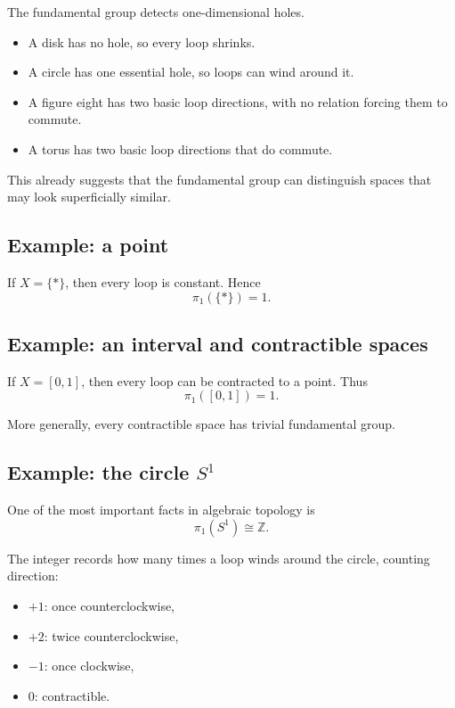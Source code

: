 \documentclass[12pt,a4paper]{article}
\theoremstyle{notespace}
\begin{document}
The fundamental group detects one-dimensional holes.

\begin{itemize}
	\item A disk has no hole, so every loop shrinks.
	\item A circle has one essential hole, so loops can wind around it.
	\item A figure eight has two basic loop directions, with no relation forcing them to commute.
	\item A torus has two basic loop directions that do commute.
\end{itemize}

This already suggests that the fundamental group can distinguish spaces that may look superficially similar.

\bigskip

\subsection{Example: a point}

If \(X=\{*\}\), then every loop is constant. Hence
\[
\pi_1(\{*\})=1.
\]

\bigskip

\subsection{Example: an interval and contractible spaces}

If \(X=[0,1]\), then every loop can be contracted to a point. Thus
\[
\pi_1([0,1])=1.
\]

More generally, every contractible space has trivial fundamental group.

\bigskip

\subsection{ Example: the circle \texorpdfstring{$S^1$}{S1}}

One of the most important facts in algebraic topology is
\[
\pi_1(S^1)\cong \mathbb Z.
\]

The integer records how many times a loop winds around the circle, counting direction:
\begin{itemize}
	\item \(+1\): once counterclockwise,
	\item \(+2\): twice counterclockwise,
	\item \(-1\): once clockwise,
	\item \(0\): contractible.
\end{itemize}
\end{document}
